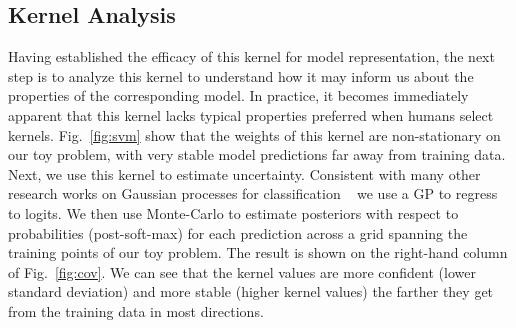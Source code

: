 


\subsection{Kernel Analysis}
Having established the efficacy of this kernel for model representation, the next step is to analyze this kernel to understand how it may inform us about the properties of the corresponding model. In practice, it becomes immediately apparent that this kernel lacks typical properties preferred when humans select kernels. Fig.~\ref{fig:svm} show that the weights of this kernel are non-stationary on our toy problem, with very stable model predictions far away from training data. Next, we use this kernel to estimate uncertainty. Consistent with many other research works on Gaussian processes for classification ~\cite{rasmussen2006gaussian} we use a GP to regress to logits. We then use Monte-Carlo to estimate posteriors with respect to probabilities (post-soft-max) for each prediction across a grid spanning the training points of our toy problem. The result is shown on the right-hand column of Fig.~\ref{fig:cov}. We can see that the kernel values are more confident (lower standard deviation) and more stable (higher kernel values) the farther they get from the training data in most directions. 

